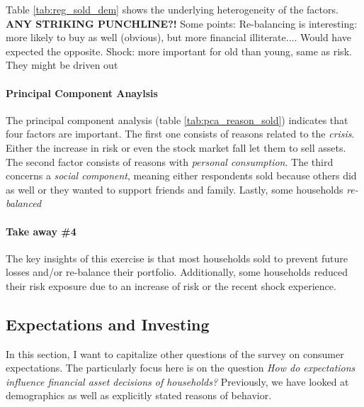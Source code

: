 \documentclass[ProjectABM]{subfiles}
\begin{document}
Table \ref{tab:reg_sold_dem} shows the underlying heterogeneity of the factors. \textbf{ANY STRIKING PUNCHLINE?! } Some points: Re-balancing is interesting: more likely to buy as well (obvious), but more financial illiterate.... Would have expected the opposite. Shock: more important for old than young, same as risk. They might be driven out

\paragraph{Principal Component Anaylsis}
The principal component analysis (table \ref{tab:pca_reason_sold}) indicates that four factors are important. The first one consists of reasons related to the \textit{crisis}. Either the increase in risk or even the stock market fall let them to sell assets. The second factor consists of reasons with \textit{personal consumption}. The third concerns a \textit{social component}, meaning either respondents sold because others did as well or they wanted to support friends and family. Lastly, some households \textit{re-balanced}



\paragraph{Take away \#4}
The key insights of this exercise is that most households sold to prevent future losses and/or re-balance their portfolio. Additionally, some households reduced their risk exposure due to an increase of risk or the recent shock experience.

\subsection{Expectations and Investing} \label{sec:results_exp}
In this section, I want to capitalize other questions of the survey on consumer expectations. The particularly focus here is on the question \textit{How do expectations influence financial asset decisions of households?} Previously, we have looked at demographics as well as explicitly stated reasons of behavior.%
\end{document}
